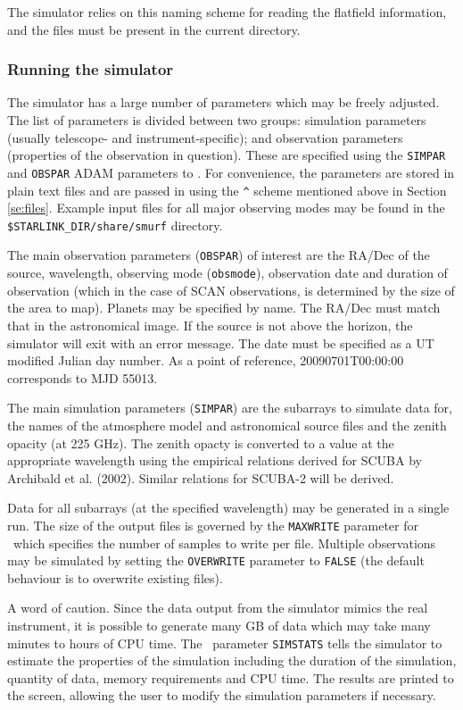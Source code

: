 \documentclass[oneside,11pt]{starlink}
\begin{document}
The simulator relies on this naming scheme for reading the flatfield
information, and the files must be present in the current directory.

\subsubsection{Running the simulator}

The simulator has a large number of parameters which may be freely
adjusted. The list of parameters is divided between two groups:
simulation parameters (usually telescope- and instrument-specific); and
observation parameters (properties of the observation in
question). These are specified using the \texttt{SIMPAR} and
\texttt{OBSPAR} ADAM parameters to \sctwosim. For convenience, the
parameters are stored in plain text files and are passed in using the
\verb+^+ scheme mentioned above in Section \ref{se:files}. Example
input files for all major observing modes may be found in the
\texttt{\$STARLINK\_DIR/share/smurf} directory.

The main observation parameters (\texttt{OBSPAR}) of interest are the
RA/Dec of the source, wavelength, observing mode (\texttt{obsmode}),
observation date and duration of observation (which in the case of
SCAN observations, is determined by the size of the area to
map). Planets may be specified by name. The RA/Dec must match that in
the astronomical image. If the source is not above the horizon, the
simulator will exit with an error message. The date must be specified
as a UT modified Julian day number. As a point of reference,
20090701T00:00:00 corresponds to MJD 55013.

The main simulation parameters (\texttt{SIMPAR}) are the subarrays to
simulate data for, the names of the atmosphere model and astronomical
source files and the zenith opacity (at 225 GHz). The zenith opacty is
converted to a value at the appropriate wavelength using the empirical
relations derived for SCUBA by Archibald et al. (2002). Similar
relations for SCUBA-2 will be derived.

Data for all subarrays (at the specified wavelength) may be generated
in a single run. The size of the output files is governed by the
\texttt{MAXWRITE} parameter for \sctwosim\ which specifies the number
of samples to write per file. Multiple observations may be simulated
by setting the \texttt{OVERWRITE} parameter to \texttt{FALSE} (the
default behaviour is to overwrite existing files).

A word of caution. Since the data output from the simulator mimics the
real instrument, it is possible to generate many GB of data which may
take many minutes to hours of CPU time. The \sctwosim\ parameter
\texttt{SIMSTATS} tells the simulator to estimate the properties of
the simulation including the duration of the simulation, quantity of
data, memory requirements and CPU time. The results are printed to the
screen, allowing the user to modify the simulation parameters if
necessary.
\end{document}
